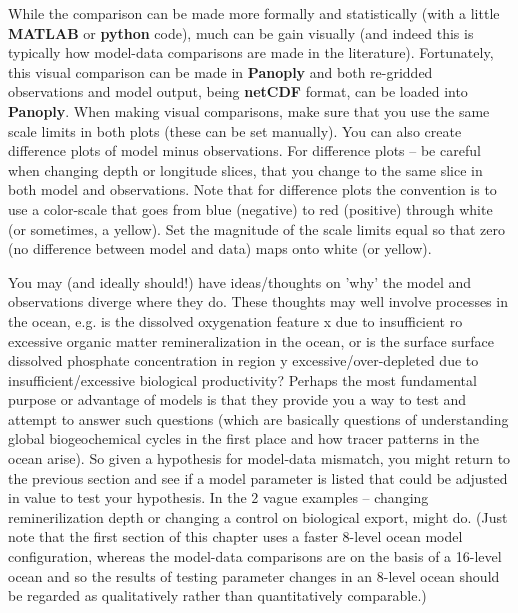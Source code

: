 \vspace{1mm}

While the comparison can be made more formally and statistically (with a little \textbf{MATLAB} or \textbf{python} code), much can be gain visually (and indeed this is typically how model-data comparisons are made in the literature). Fortunately, this visual comparison can be made in \textbf{Panoply} and both re-gridded observations and model output, being \textbf{netCDF} format, can be loaded into \textbf{Panoply}. When making visual comparisons, make sure that you use the same scale limits in both plots (these can be set manually). You can also create difference plots of model minus observations. For difference plots -- be careful when changing depth or longitude slices, that you change to the same slice in both model and observations. Note that for difference plots the convention is to use a color-scale that goes from blue (negative) to red (positive) through white (or sometimes, a yellow). Set the magnitude of the scale limits equal so that zero (no difference between model and data) maps onto white (or yellow).

You may (and ideally should!) have ideas/thoughts on 'why' the model and observations diverge where they do. These thoughts may well involve processes in the ocean, e.g. is the dissolved oxygenation feature x due to insufficient ro excessive organic matter remineralization in the ocean, or is the surface surface dissolved phosphate concentration in region y excessive/over-depleted due to insufficient/excessive biological productivity? Perhaps the most fundamental purpose or advantage of models is that they provide you a way to test and attempt to answer such questions (which are basically questions of understanding global biogeochemical cycles in the first place and how tracer patterns in the ocean arise). So given a hypothesis for model-data mismatch, you might return to the previous section and see if a model parameter is listed that could be adjusted in value to test your hypothesis. In the 2 vague examples -- changing reminerilization depth or changing a control on biological export, might do. (Just note that the first section of this chapter uses a faster 8-level ocean model configuration, whereas the model-data comparisons are on the basis of a 16-level ocean and so the results of testing parameter changes in an 8-level ocean should be regarded as qualitatively rather than quantitatively comparable.)

\newpage


